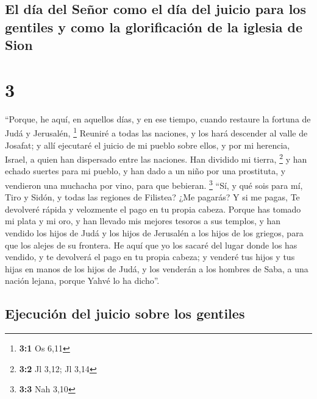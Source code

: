 \hypertarget{el-duxeda-del-seuxf1or-como-el-duxeda-del-juicio-para-los-gentiles-y-como-la-glorificaciuxf3n-de-la-iglesia-de-sion}{%
\subsection{El día del Señor como el día del juicio para los gentiles y
como la glorificación de la iglesia de
Sion}\label{el-duxeda-del-seuxf1or-como-el-duxeda-del-juicio-para-los-gentiles-y-como-la-glorificaciuxf3n-de-la-iglesia-de-sion}}

\hypertarget{section-2}{%
\section{3}\label{section-2}}

 ``Porque, he aquí, en aquellos días, y en ese tiempo,
cuando restaure la fortuna de Judá y Jerusalén, \footnote{\textbf{3:1}
  Os 6,11}  Reuniré a todas las naciones, y los hará
descender al valle de Josafat; y allí ejecutaré el juicio de mi pueblo
sobre ellos, y por mi herencia, Israel, a quien han dispersado entre las
naciones. Han dividido mi tierra, \footnote{\textbf{3:2} Jl 3,12; Jl
  3,14}  y han echado suertes para mi pueblo, y han dado a
un niño por una prostituta, y vendieron una muchacha por vino, para que
bebieran. \footnote{\textbf{3:3} Nah 3,10}  ``Sí, y qué
sois para mí, Tiro y Sidón, y todas las regiones de Filistea? ¿Me
pagarás? Y si me pagas, Te devolveré rápida y velozmente el pago en tu
propia cabeza.  Porque has tomado mi plata y mi oro, y han
llevado mis mejores tesoros a sus templos,  y han vendido
los hijos de Judá y los hijos de Jerusalén a los hijos de los griegos,
para que los alejes de su frontera.  He aquí que yo los
sacaré del lugar donde los has vendido, y te devolverá el pago en tu
propia cabeza;  y venderé tus hijos y tus hijas en manos
de los hijos de Judá, y los venderán a los hombres de Saba, a una nación
lejana, porque Yahvé lo ha dicho''.

\hypertarget{ejecuciuxf3n-del-juicio-sobre-los-gentiles}{%
\subsection{Ejecución del juicio sobre los
gentiles}\label{ejecuciuxf3n-del-juicio-sobre-los-gentiles}}

